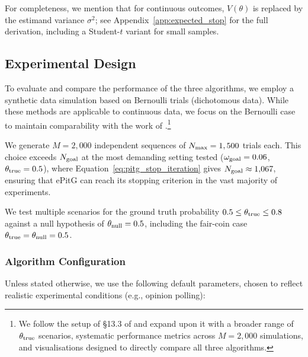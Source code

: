 For completeness, we mention that for continuous outcomes, $V(\theta)$ is replaced by the
estimand variance $\sigma^2$; see Appendix~\ref{app:expected_stop} for the full
derivation, including a Student-$t$ variant for small samples.

\subsection{Experimental Design}\label{sec:experimental_design}

To evaluate and compare the performance of the three algorithms,
we employ a synthetic data simulation based on Bernoulli trials (dichotomous data).
While these methods are applicable to continuous data, we focus on the Bernoulli case
to maintain comparability with the work of \cite{kruschke2015doing}.\footnote{We follow
the setup of \S13.3 of \cite{kruschke2015doing} and expand upon it with a broader
range of $\theta_{\rm true}$ scenarios, systematic performance metrics across $M=2{,}000$
simulations, and visualisations designed to directly compare all three algorithms.}

We generate $M=2,000$ independent sequences of $N_{\rm max}=1,500$ trials each.
This choice exceeds $N_{\rm goal}$ at the most demanding setting tested ($\omega_{\rm goal}=0.06$,
$\theta_{\rm true}=0.5$), where Equation~\ref{eq:pitg_stop_iteration} gives $N_{\rm goal}\approx 1{,}067$,
ensuring that ePitG can reach its stopping criterion in the vast majority of experiments.

We test multiple scenarios for the ground truth probability $0.5 \le \theta_{\rm true} \le 0.8$
against a null hypothesis of $\theta_{\rm null}=0.5$, including the fair-coin case
$\theta_{\rm true}=\theta_{\rm null}=0.5$.
\subsubsection{Algorithm Configuration}

Unless stated otherwise, we use the following default parameters, chosen to reflect realistic experimental conditions (e.g., opinion polling):

